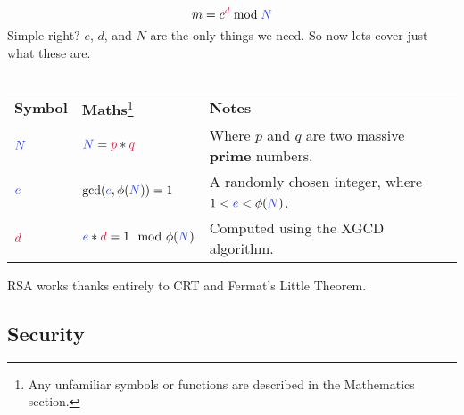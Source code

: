 		$$ m = c^{\textcolor{R}{d}} \bmod \textcolor{B}{N} $$
		Simple right? $e$, $d$, and $N$ are the only things we need. So now lets cover just what these are.\\
		\\
	  \begin{tabularx}{\linewidth}{l l X}
	  \textbf{Symbol} & \textbf{Maths}\footnote{Any unfamiliar symbols or functions are described in the Mathematics section.} & \textbf{Notes}\\
	  $\textcolor{B}{N}$ & $\textcolor{B}{N} = \textcolor{R}{p} * \textcolor{R}{q}$ & Where $p$ and $q$ are two massive \textbf{prime} numbers.
	  \\
	  $\textcolor{B}{e}$ & $\gcd(\textcolor{B}{e},\phi(\textcolor{B}{N}))=1$ & A randomly chosen integer, where $1 < \textcolor{B}{e} < \phi(\textcolor{B}{N})$.
	  \\
	  $\textcolor{R}{d}$ & $\textcolor{B}{e}*\textcolor{R}{d} = 1 \mod \phi(\textcolor{B}{N})$ & Computed using the XGCD algorithm.
	  \\
	  \end{tabularx}
	  RSA works thanks entirely to CRT and Fermat's Little Theorem.

	\subsection{Security}

